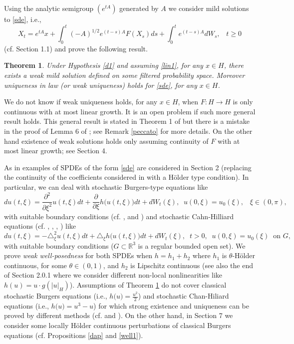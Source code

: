 \documentclass[preprint]{imsart}
\newtheorem{theorem}{Theorem}
\def\R{\mathbb R}
\begin{document}
 
 
\smallskip  
 Using the analytic  semigroup   $(e^{tA})$   generated by $A$ 
 we consider   mild solutions to \eqref{sde},  i.e., 
\begin{equation*} 
  \label{mq1} 
X_{t}=e^{tA}x+\int_{0}^{t}(-A)^{1/2}e^{(  t-s)  A}F  (
X_{s})
ds
+\int_{0}^{t}e^{(  t-s)  A}dW_{s},\;\;\; t \ge 0
\end{equation*}  
(cf. Section 1.1) and   prove
  the following result.
\begin{theorem}
\label{base}  
 Under Hypothesis \ref{d1}  and assuming \eqref{lin1}, for any $x \in H$,  there exists a weak mild solution defined on some filtered probability space.  
 Moreover uniqueness in law (or weak uniqueness) holds for \eqref{sde}, for any $x \in H$.     
\end{theorem}
We do not know if weak uniqueness holds, for any $x \in H$, when $F: H \to H $ is only continuous with at most linear growth. It is an open problem if such more general result 
holds.   This general result is stated in Theorem 1 of \cite{priolaAOP} but there is a mistake in the proof of Lemma 6 of \cite{priolaAOP};  see  Remark \ref{peccato} for more details.  
  On the other hand 
existence  of weak solutions holds only assuming  continuity of $F$ with at most linear growth; see Section  4. 
 
As in \cite{priolaAOP} examples of SPDEs of the form \eqref{sde} are considered in Section 2 (replacing the continuity of  the coefficients considered in \cite{priolaAOP} with  a  H\"older type condition). In  particular, we can deal with  stochastic Burgers-type equations like  
 $$ 
d u (t, \xi)=   \frac{\partial^2}{\partial   \xi^2}  u(t, \xi) {   dt} +   \frac{\partial }{\partial \xi} {  h( } u(t, \xi)){   dt}  + dW_t(\xi), \;\; u(0, \xi) = u_0(\xi), \;\;\; \xi \in (0,\pi), 
$$ 
 with suitable boundary conditions (cf. \cite{Gy}, \cite{D2} and \cite{RS}) and stochastic Cahn-Hilliard equations (cf. \cite{EM}, \cite{DD}, \cite{NC}, \cite{ES}) like   
$$ 
d u (t, \xi)= -  \triangle^2_{\xi} u(t, \xi){   dt} + \triangle_\xi {  h( }u(t, \xi)){   dt} + dW_t(\xi), \;\;t>0,\;\;  u(0, \xi) = u_0(\xi)\;\; \text{on $G$}, 
$$
 with suitable boundary conditions ($G \subset \R^3$ is a regular bounded open set).
  We  prove {\sl weak well-posedness} for both SPDEs when     $h = h_1 + h_2$  where  $h_1$ is $\theta$-H\"older continuous, for some $\theta \in (0,1)$,  and $h_2$ is Lipschitz continuous   (see also the end of   Section 2.0.1 where we  consider different non-local nonlinearities like $h(u) = u \cdot g(|u|_H)$).  
 Assumptions of Theorem \ref{base}   do not cover classical stochastic  Burgers equations (i.e., ${   h( }u) = \frac{u^2}{2}$) and stochastic Chan-Hiliard equations (i.e., ${   h( }u) = u^3 -u$) for which strong existence and uniqueness can be proved by different methods (cf. \cite{brezniak} and \cite{DD}).
  On the other hand, in Section 7 we  consider   some  locally H\"older continuous  perturbations of classical Burgers equations (cf. Propositions \ref{dap} and \ref{well1}).    
      
\end{document}
